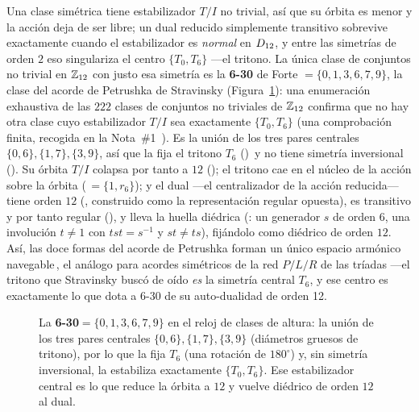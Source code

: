 Una clase simétrica tiene estabilizador $T/I$ no trivial, así que su órbita es menor y la acción deja de
ser libre; un dual reducido simplemente transitivo sobrevive exactamente cuando el estabilizador es
\emph{normal} en $D_{12}$, y entre las simetrías de orden $2$ eso singulariza el centro $\{T_0,T_6\}$
---el tritono. La única clase de conjuntos no trivial en $\mathbb{Z}_{12}$ con justo esa simetría es la
\textbf{6-30} de Forte $=\{0,1,3,6,7,9\}$, la clase del acorde de Petrushka de Stravinsky
(Figura~\ref{fig:p2-clock}): una enumeración exhaustiva de las $222$ clases de conjuntos no triviales de
$\mathbb{Z}_{12}$ confirma que no hay otra clase cuyo estabilizador $T/I$ sea exactamente $\{T_0,T_6\}$ (una
comprobación finita, recogida en la Nota~\#1~\cite{Note1}). Es la unión de los tres pares centrales
$\{0,6\},\{1,7\},\{3,9\}$, así que la
fija el tritono $T_6$ ()\, y no tiene simetría inversional
(). Su órbita $T/I$ colapsa por tanto a $12$ (); el
tritono cae en el núcleo de la acción sobre la órbita (\,$=\{1,r_6\}$); y el dual ---el
centralizador de la acción reducida--- tiene orden $12$ (, construido como la
representación regular opuesta), es transitivo y por tanto regular (), y lleva la
huella diédrica (: un generador $s$ de orden $6$, una involución $t\neq1$ con
$tst=s^{-1}$ y $st\neq ts$), fijándolo como diédrico de orden $12$. Así, las doce formas del acorde de
Petrushka forman un único espacio armónico navegable\,, el análogo para acordes
simétricos de la red $P/L/R$ de las tríadas ---el tritono que Stravinsky buscó de oído \emph{es} la
simetría central $T_6$, y ese centro es exactamente lo que dota a 6-30 de su auto-dualidad de orden 12.

\begin{figure}[ht]
\centering
{}
\caption{La \textbf{6-30}$=\{0,1,3,6,7,9\}$ en el reloj de clases de altura: la unión de los tres pares
centrales $\{0,6\},\{1,7\},\{3,9\}$ (diámetros gruesos de tritono), por lo que la fija $T_6$ (una rotación
de $180^\circ$) y, sin simetría inversional, la estabiliza exactamente $\{T_0,T_6\}$. Ese estabilizador
central es lo que reduce la órbita a $12$ y vuelve diédrico de orden $12$ al dual.}
\label{fig:p2-clock}
\end{figure}

